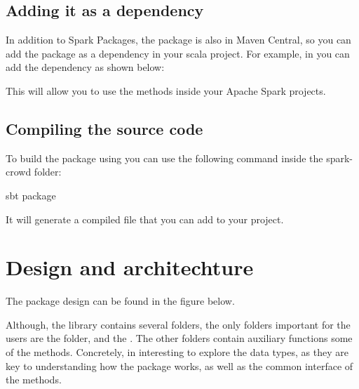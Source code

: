 \documentclass[letterpaper,10pt,english]{sphinxmanual}
\begin{document}
\section{Adding it as a dependency}
\label{\detokenize{usage/installation:adding-it-as-a-dependency}}
In addition to Spark Packages, the package is also in Maven Central, so you can add the package as a dependency in your scala project.
For example, in  you can add the dependency as shown below:

%
\begin{sphinxVerbatim}[commandchars=\\\{\}]
      
\end{sphinxVerbatim}

This will allow you to use the methods inside your Apache Spark projects.


\section{Compiling the source code}
\label{\detokenize{usage/installation:compiling-the-source-code}}
To build the package using  you can use the following command inside the spark-crowd folder:

%
\begin{sphinxVerbatim}[commandchars=\\\{\}]
sbt package
\end{sphinxVerbatim}

It will generate a compiled  file that you can add to your project.


\chapter{Design and architechture}
\label{\detokenize{package/design:design-and-architechture}}\label{\detokenize{package/design::doc}}
The package design can be found in the figure below.

\noindent{}

Although, the library contains several folders, the only folders important for the users
are the  folder, and the . The other folders contain auxiliary
functions some of the methods. Concretely, in interesting to explore the data types, as
they are key to understanding how the package works, as well as the common interface of
the methods.
\end{document}
